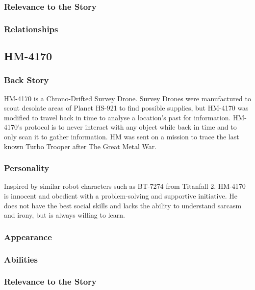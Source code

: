 \documentclass[12pt]{article}
\begin{document}
\subsubsection{Relevance to the Story}

\subsubsection{Relationships}

\subsection{HM-4170}

\subsubsection{Back Story}

HM-4170 is a Chrono-Drifted Survey Drone. Survey Drones were manufactured to scout desolate areas of Planet HS-921 to find possible supplies, but HM-4170 was modified to travel back in time to analyse a location's past for information. HM-4170's protocol is to never interact with any object while back in time and to only scan it to gather information. HM was sent on a mission to trace the last known Turbo Trooper after The Great Metal War. 

\subsubsection{Personality}

Inspired by similar robot characters such as BT-7274 from Titanfall 2. HM-4170 is innocent and obedient with a problem-solving and supportive initiative. He does not have the best social skills and lacks the ability to understand sarcasm and irony, but is always willing to learn.

\subsubsection{Appearance}

\subsubsection{Abilities}

\subsubsection{Relevance to the Story}
\end{document}
